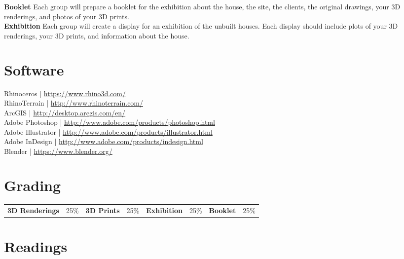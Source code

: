\documentclass[11pt,article,oneside]{memoir}
\begin{document}
\noindent \textbf{Booklet}
Each group will prepare a booklet for the exhibition 
about the house, the site, the clients, the original drawings, 
your 3D renderings, and photos of your 3D prints.\\

\noindent \textbf{Exhibition}
Each group will create a display for 
an exhibition of the unbuilt houses.
Each display should include
plots of your 3D renderings,
your 3D prints, and 
information about the house.\\

\clearpage

\section{Software}
Rhinoceros | \url{https://www.rhino3d.com/}\\
RhinoTerrain | \url{http://www.rhinoterrain.com/}\\
ArcGIS | \url{http://desktop.arcgis.com/en/}\\
Adobe Photoshop | \url{http://www.adobe.com/products/photoshop.html}\\
Adobe Illustrator | \url{http://www.adobe.com/products/illustrator.html}\\
Adobe InDesign | \url{http://www.adobe.com/products/indesign.html}\\
Blender | \url{https://www.blender.org/}\\

\section{Grading}

\begin{table}[H]
\small
\begin{tabular}{l l l l l l l l}
\textbf{3D Renderings} & 25\% &
\textbf{3D Prints} & 25\% &
\textbf{Exhibition} & 25\% &
\textbf{Booklet} & 25\% \\
\end{tabular}
\end{table}

\section{Readings}
\renewcommand*{\bibfont}{\normalsize} %
\vspace*{0.5cm}
\nocite{*}
\setlength{}
\printbibliography[heading=none]
\end{document}
